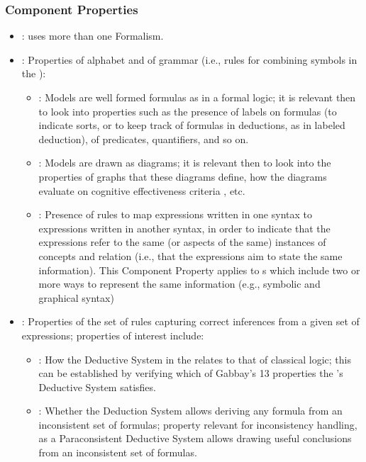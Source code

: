 \documentclass[10pt, final, conference, compsocconf]{IEEEtran}
\begin{document}
\subsubsection{Component Properties}
\begin{itemize}
\item{:  uses more than one Formalism.}
\item{: Properties of alphabet and of grammar (i.e., rules for combining symbols in the ):
\begin{itemize}
\item{: Models are well formed formulas as in a formal logic; it is relevant then to look into properties such as the presence of labels on formulas (to indicate sorts, or to keep track of formulas in deductions, as in labeled deduction), of predicates, quantifiers, and so on.}
\item{: Models are drawn as diagrams; it is relevant then to look into the properties of graphs that these diagrams define, how the diagrams evaluate on cognitive effectiveness criteria \cite{Moody+:2010:REJ}, etc.}
\item{: Presence of rules to map expressions written in one syntax to expressions written in another syntax, in order to indicate that the expressions refer to the same (or aspects of the same) instances of concepts and relation (i.e., that the expressions aim to state the same information). This Component Property applies to s which include two or more ways to represent the same information (e.g., symbolic and graphical syntax)}
\end{itemize}}
\item{: Properties of the set of rules capturing correct inferences from a given set of expressions; properties of interest include:
\begin{itemize}
\item{: How the Deductive System in the  relates to that of classical logic; this can be established by verifying which of Gabbay's \cite{Gabbay:1985} 13 properties the 's Deductive System satisfies.}
\item{: Whether the Deduction System allows deriving any formula from an inconsistent set of formulas; property relevant for inconsistency handling, as a Paraconsistent Deductive System allows drawing useful conclusions from an inconsistent set of formulas.}

\end{itemize}}
\end{itemize}
\end{document}
